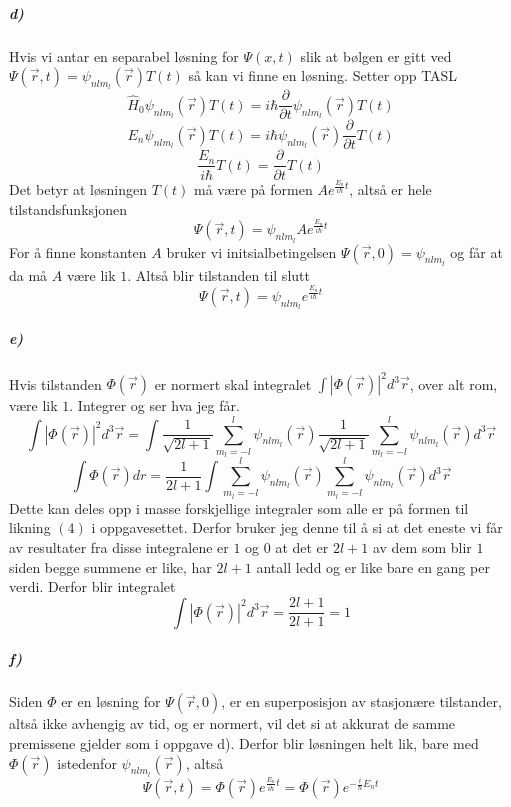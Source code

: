 \documentclass[11pt, A4paper,norsk]{article}
\begin{document}
			\subparagraph{d)}
				\begin{flushleft}
Hvis vi antar en separabel løsning for $\Psi(x, t)$ slik at bølgen er gitt ved $\Psi(\vec{r}, t) = \psi_{nlm_{l}}(\vec{r}) T(t)$ så kan vi finne en løsning. Setter opp TASL
$$\hat{H}_0 \psi_{nlm_{l}}(\vec{r}) T(t) = i \hbar \frac{\partial }{\partial t} \psi_{nlm_{l}}(\vec{r}) T(t)$$
$$E_n \psi_{nlm_{l}}(\vec{r}) T(t) = i \hbar \psi_{nlm_{l}}(\vec{r}) \frac{\partial }{\partial t} T(t)$$
$$\frac{E_n}{i \hbar} T(t) = \frac{\partial }{\partial t} T(t)$$
Det betyr at løsningen $T(t)$ må være på formen $A e^{\frac{E_n}{i \hbar} t}$, altså er hele tilstandsfunksjonen
$$\Psi(\vec{r}, t) = \psi_{nlm_{l}} A e^{\frac{E_n}{i \hbar} t}$$
For å finne konstanten $A$ bruker vi initsialbetingelsen $\Psi(\vec{r}, 0) = \psi_{nlm_{l}}$ og får at da må $A$ være lik $1$. Altså blir tilstanden til slutt
$$\Psi(\vec{r}, t) = \psi_{nlm_{l}} e^{\frac{E_n}{i \hbar} t}$$
				\end{flushleft}










			\subparagraph{e)}
				\begin{flushleft}
Hvis tilstanden $\Phi(\vec{r})$ er normert skal integralet $\int |\Phi(\vec{r})|^2 d^3\vec{r}$, over alt rom, være lik $1$. Integrer og ser hva jeg får.
$$\int |\Phi(\vec{r})|^2 d^3\vec{r} = \int \frac{1}{\sqrt{2l + 1}} \sum_{m_l = -l}^{l} \psi_{nlm_{l}}(\vec{r}) \frac{1}{\sqrt{2l + 1}} \sum_{m_l = -l}^{l} \psi_{nlm_{l}}(\vec{r}) d^3\vec{r}$$
$$\int \Phi(\vec{r}) dr = \frac{1}{2l + 1} \int \sum_{m_l = -l}^{l} \psi_{nlm_{l}}(\vec{r}) \sum_{m_l = -l}^{l} \psi_{nlm_{l}}(\vec{r}) d^3\vec{r}$$
Dette kan deles opp i masse forskjellige integraler som alle er på formen til likning $(4)$ i oppgavesettet. Derfor bruker jeg denne til å si at det eneste vi får av resultater fra disse integralene er $1$ og $0$ at det er $2l + 1$ av dem som blir $1$ siden begge summene er like, har $2l + 1$ antall ledd og er like bare en gang per verdi. Derfor blir integralet
$$\int |\Phi(\vec{r})|^2 d^3\vec{r} = \frac{2l + 1}{2l + 1} = 1$$
				\end{flushleft}









			\subparagraph{f)}
				\begin{flushleft}
Siden $\Phi$ er en løsning for $\Psi(\vec{r}, 0)$, er en superposisjon av stasjonære tilstander, altså ikke avhengig av tid, og er normert, vil det si at akkurat de samme premissene gjelder som i oppgave d). Derfor blir løsningen helt lik, bare med $\Phi(\vec{r})$ istedenfor $\psi_{nlm_{l}}(\vec{r})$, altså
$$\Psi(\vec{r}, t) = \Phi(\vec{r}) e^{\frac{E_n}{i \hbar} t} = \Phi(\vec{r}) e^{- \frac{i}{\hbar} E_n t}$$
				\end{flushleft}
\end{document}
